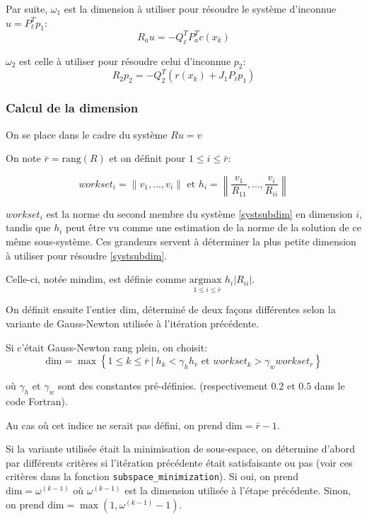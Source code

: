 \documentclass[a4paper,11pt]{article}
\numberwithin{equation}{section}
\begin{document}
Par suite, $\omega_{1}$ est la dimension à utiliser pour résoudre le système d'inconnue $u=P_{\ell}^{T}p_1$: $$R_{a}u = -Q_{\ell}^TP_{a}^Tc(x_{k})$$

 $\omega_{2}$ est celle à utiliser pour résoudre celui d'inconnue $p_{2}$: $$R_{2}p_2 = -Q_2^T(r(x_{k}) + J_1P_{\ell}p_1)$$ 
 
 \subsubsection{Calcul de la dimension}
 
 On se place dans le cadre du système $Ru=v$
 
 On note $\bar{r}=\text{rang}(R)$ et on définit pour $1\leq i \leq \bar{r}$:
\newcommand{\ws}{workset}
 
 $$\ws_{i} = \|v_{1},\ldots, v_{i}\| \text{ et } h_{i}=\left \|\frac{v_{1}}{R_{11}},\ldots,\frac{v_{i}}{R_{ii}} \right \|$$
 
 $\ws_{i}$ est la norme du second membre du système \eqref{systsubdim} en dimension $i$, tandis que $h_{i}$ peut être vu comme une estimation de la norme de la solution de ce même sous-système. Ces grandeurs servent à déterminer la plus petite dimension à utiliser pour résoudre \eqref{systsubdim}.
 
 Celle-ci, notée $\text{mindim}$, est définie comme $\underset{1\leq i \leq \bar{r}}{\text{argmax }} h_{i}|R_{ii}|$.
 
On définit ensuite l'entier dim, déterminé de deux fa\c cons différentes selon la variante de Gauss-Newton utilisée à l'itération précédente.

Si c'était Gauss-Newton rang plein, on choisit:
$$
\text{dim}= \max \left\{ 1\leq k \leq \bar{r}\ | \ h_{k} < \gamma_{h}h_{\bar{r}} \text{ et } \ws_{k} > \gamma_{w}\ws_{\bar{r}} \right\}
$$

où $\gamma_{h}$ et $\gamma_{w}$ sont des constantes pré-définies. (respectivement $0.2$ et $0.5$ dans le code Fortran).

Au cas où cet indice ne serait pas défini, on prend $\text{dim}=\bar{r}-1$.

Si la variante utilisée était la minimisation de sous-espace, on détermine d'abord par différents critères si l'itération précédente était satisfaisante ou pas (voir ces critères dans la fonction \texttt{subspace\_minimization}). Si oui, on prend  $\text{dim}=\omega^{(k-1)}$ où $\omega^{(k-1)}$ est la dimension utilisée à l'étape précédente. Sinon, on prend $\text{dim}=\max(1,\omega^{(k-1)}-1)$.
\end{document}
